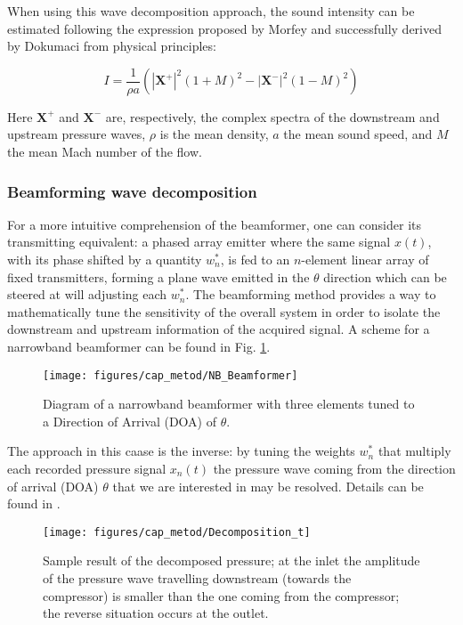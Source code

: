 When using this wave decomposition approach, the sound intensity can be estimated following the expression proposed by Morfey \cite{morfey1971sound} and successfully derived by Dokumaci \cite{dokumaci2000calculation} from physical principles:

\begin{equation}\label{eq:metod_intensity}
    I=\frac{1}{\rho a}\left(|\mathbf X^+ |^2(1+M)^2-|\mathbf X^- |^2(1-M)^2\right)
\end{equation}

Here $\mathbf X^+$ and $\mathbf X^-$ are, respectively, the complex spectra of the downstream and upstream pressure waves, $\rho$ is the mean density, $a$ the mean sound speed, and $M$ the mean Mach number of the flow.

\subsubsection{Beamforming wave decomposition}
For a more intuitive comprehension of the beamformer, one can consider its transmitting equivalent: a phased array emitter where the same signal $x(t)$, with its phase shifted by a quantity $w_n^*$, is fed to an $n$-element linear array of fixed transmitters, forming a plane wave emitted in the $\theta$ direction which can be steered at will adjusting each $w_n^*$.
The beamforming method provides a way to mathematically tune the sensitivity of the overall system in order to isolate the downstream and upstream information of the acquired signal. A scheme for a narrowband beamformer can be found in Fig. \ref{fig:schematic}.

\begin{figure}[b!]
\centering
\texttt{[image: figures/cap\_metod/NB\_Beamformer]}
\caption{Diagram of a narrowband beamformer with three elements tuned to a Direction of Arrival (DOA) of $\theta$.}
\label{fig:schematic}
\end{figure}

The approach in this caase is the inverse: by tuning the weights $w_n^*$ that multiply each recorded pressure signal $x_n(t)$ the pressure wave coming from the direction of arrival (DOA) $\theta$ that we are interested in may be resolved. Details can be found in \cite{van1988beamforming}.

\begin{figure}[t!]
\centering
\texttt{[image: figures/cap\_metod/Decomposition\_t]}
\caption{Sample result of the decomposed pressure; at the inlet the amplitude of the pressure wave travelling downstream (towards the compressor) is smaller than the one coming from the compressor; the reverse situation occurs at the outlet.}
\label{fig:decomposition}
\end{figure}

